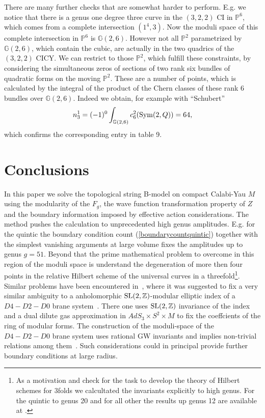 \documentclass[12pt]{article}
\begin{document}
There are many further checks that are somewhat harder to perform.
E.g. we notice that there is a genus one degree three curve in the
$(3,2,2)$ CI in $\mathbb{P}^6$, which comes from a complete
intersection $(1^4,3)$. Now the moduli space of this complete
intersection in  $\mathbb{P}^6$ is $\mathbb{G}(2,6)$. However not
all $\mathbb{P}^2$ parametrized by $\mathbb{G}(2,6)$, which
contain the cubic, are actually in the two quadrics of the
$(3,2,2)$ CICY. We can restrict to those $\mathbb{P}^2$, which
fulfill these constraints, by considering the simultaneous zeros
of sections of two rank six bundles of quadratic forms on the
moving $\mathbb{P}^2$. These are a number of points, which is
calculated by the integral of the product of the Chern classes of
these rank 6 bundles over  $\mathbb{G}(2,6)$. Indeed we obtain,
for example with ``Schubert'' \cite{Schubert}
\begin{equation}
n_3^1=(-1)^0 \int_{\mathbb{G}(2,6)} c^2_6({\rm Sym}(2,Q))=64,
\end{equation}
which confirms the corresponding entry in table 9.



\section{Conclusions}

In this paper we solve the topological string B-model on compact
Calabi-Yau $M$ using the modularity of the $F_g$,
the wave function transformation property of $Z$ and the boundary
information imposed by effective action considerations. The method
pushes the calculation to unprecedented high genus amplitudes.
E.g. for the quintic the boundary condition count
(\ref{boundarycountquintic}) together with the simplest vanishing
arguments at large volume fixes the amplitudes up to genus $g=51$.
Beyond that the  prime mathematical problem to overcome in this
region of the moduli space is understand the degeneration of more
then four points in the relative Hilbert scheme of the universal
curves in a threefold\footnote{As a motivation and check for the
task to develop the  theory of Hilbert schemes for 3folds we
calcultated the invariants explicitly to high genus. For the
quintic to genus 20 and for all other the results up genus 12 are
available at \cite{webpage}.}. Similar problems have been
encountered in~\cite{Gaiotto:2006wm}, where it was suggested to
fix a very similar ambiguity to a anholomorphic ${\rm
SL}(2,\mathbb{Z})$-modular elliptic index of a $D4-D2-D0$ brane
system~\cite{Gaiotto:2006wm,deBoer:2006vg,DennefMoore}. There one  uses
${\rm SL}(2,\mathbb{Z})$ invariance of the index and a dual dilute gas
approximation in $AdS_3\times S^2\times M$ to fix the coeffcients 
of the ring of modular forms. The construction of the moduli-space of the  
$D4-D2-D0$ brane system uses rational GW invariants and implies non-trivial 
relations among them~\cite{Gaiotto:2006wm}. Such considerations 
could in principal provide further boundary conditions 
at large radius.
\end{document}

